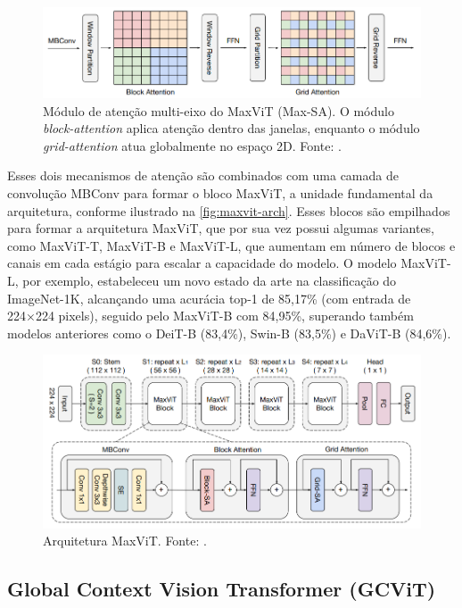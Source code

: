 \begin{figure}[!htbp]
    \centering
    \includegraphics[width=\linewidth]{figs/max-sa.png}
    \caption{Módulo de atenção multi-eixo do MaxViT (Max-SA). O módulo \textit{block-attention} aplica atenção dentro das janelas, enquanto o módulo \textit{grid-attention} atua globalmente no espaço 2D. Fonte: .}
    \label{fig:max-sa}
\end{figure}

Esses dois mecanismos de atenção são combinados com uma camada de convolução MBConv para formar o bloco MaxViT, a unidade fundamental da arquitetura, conforme ilustrado na \autoref{fig:maxvit-arch}. Esses blocos são empilhados para formar a arquitetura MaxViT, que por sua vez possui algumas variantes, como MaxViT-T, MaxViT-B e MaxViT-L, que aumentam em número de blocos e canais em cada estágio para escalar a capacidade do modelo. O modelo MaxViT-L, por exemplo, estabeleceu um novo estado da arte na classificação do ImageNet-1K, alcançando uma acurácia top-1 de 85,17\% (com entrada de 224×224 pixels), seguido pelo MaxViT-B com 84,95\%, superando também modelos anteriores como o DeiT-B (83,4\%), Swin-B (83,5\%) e DaViT-B (84,6\%).

\begin{figure}[!htbp]
    \centering
    \includegraphics[width=\linewidth]{figs/maxvit-arch.png}
    \caption{Arquitetura MaxViT. Fonte: .}
    \label{fig:maxvit-arch}
\end{figure}

\subsection{Global Context Vision Transformer (GCViT)}

